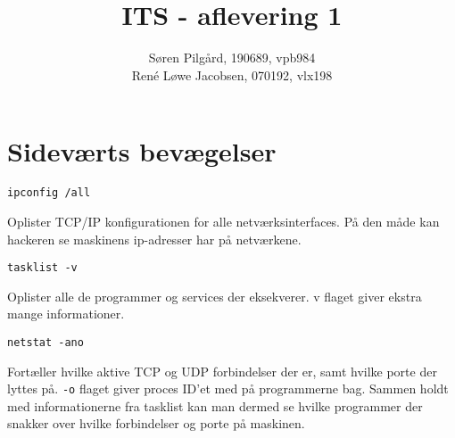 \documentclass[10pt,a4paper,danish]{article}
\title{ITS - aflevering 1}
\author{Søren Pilgård, 190689, vpb984\\
René Løwe Jacobsen, 070192, vlx198}
\begin{document}
\maketitle
\newpage

\tableofcontents
\newpage

\section{}





\section{}

\section{Sideværts bevægelser}

\begin{verbatim}
ipconfig /all
\end{verbatim}
Oplister TCP/IP konfigurationen for alle netværksinterfaces.
På den måde kan hackeren se maskinens ip-adresser har på netværkene.

\begin{verbatim}
tasklist -v
\end{verbatim}
Oplister alle de programmer og services der eksekverer. v flaget giver ekstra
mange informationer.

\begin{verbatim}
netstat -ano
\end{verbatim}
Fortæller hvilke aktive TCP og UDP forbindelser der er, samt hvilke porte der
lyttes på. \texttt{-o} flaget giver proces ID'et med på programmerne bag.
Sammen holdt med informationerne fra tasklist kan man dermed se hvilke
programmer der snakker over hvilke forbindelser og porte på maskinen.
\end{document}
